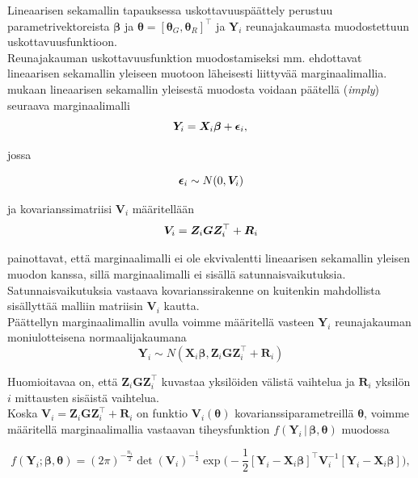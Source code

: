 \documentclass[finnish]{docopts}
\begin{document}
Lineaarisen sekamallin tapauksessa uskottavuuspäättely perustuu parametrivektoreista $\bm{\beta}$ ja $\bm{\theta} = [\bm{\theta}_G, \bm{\theta}_R]^\top$ ja $\bm{Y}_i$ reunajakaumasta muodostettuun uskottavuusfunktioon. \\

Reunajakauman uskottavuusfunktion muodostamiseksi mm. \cite{west14} ehdottavat lineaarisen sekamallin yleiseen muotoon läheisesti liittyvää marginaalimallia. \cite{west14} mukaan lineaarisen sekamallin yleisestä muodosta voidaan päätellä (\textit{imply}) seuraava marginaalimalli \\

$$
\bm{Y}_i = \bm{X}_i \bm{\beta} + \bm{\epsilon}_i, \\
$$

jossa

$$
\bm{\epsilon}_i \sim N(0,\bm{V}_i) \\
$$

ja kovarianssimatriisi $\bm{V}_i$ määritellään\\

$$
\bm{V}_i = \bm{Z}_i \bm{G} \bm{Z}^\top_i + \bm{R}_i \\
$$

\cite{west14} painottavat, että marginaalimalli ei ole ekvivalentti lineaarisen sekamallin yleisen muodon kanssa, sillä marginaalimalli ei sisällä satunnaisvaikutuksia. Satunnaisvaikutuksia vastaava kovarianssirakenne on kuitenkin mahdollista sisällyttää malliin matriisin $\bm{V}_i$ kautta.\\

Päättellyn marginaalimallin avulla voimme määritellä vasteen $\bm{Y}_i$ reunajakauman moniulotteisena normaalijakaumana \\

$$
\bm{Y}_i \sim N(\bm{X}_i \bm{\beta}, \bm{Z}_i \bm{G} \bm{Z}^\top_i + \bm{R}_i)
$$

Huomioitavaa on, että $\bm{Z}_i \bm{G} \bm{Z}^\top_i$ kuvastaa yksilöiden välistä vaihtelua ja $\bm{R}_i$ yksilön $i$ mittausten sisäistä vaihtelua. \\

Koska $\bm{V}_i = \bm{Z}_i \bm{G} \bm{Z}^\top_i + \bm{R}_i$ on funktio $\bm{V}_i(\bm{\theta})$ kovarianssiparametreillä $\bm{\theta}$, voimme määritellä marginaalimallia vastaavan tiheysfunktion $f(\bm{Y}_i \, | \, \bm{\beta}, \bm{\theta})$ muodossa 

$$
f(\bm{Y}_i;\bm{\beta}, \bm{\theta}) = (2\pi)^{-\frac{n_i}{2}} \det (\bm{V}_i)^{-\frac{1}{2}} \exp \big( -\frac{1}{2} [\bm{Y}_i - \bm{X}_i \bm{\beta}]^\top \bm{V}_i^{-1} [\bm{Y}_i - \bm{X}_i \bm{\beta}]\big),
$$
\end{document}
